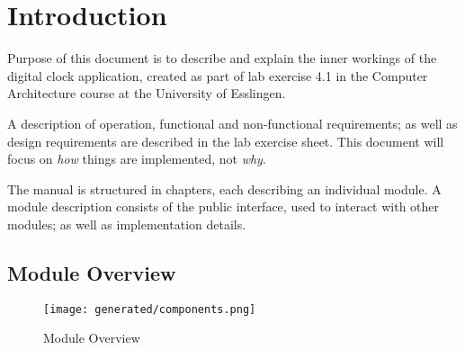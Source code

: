 \chapter{Introduction}

Purpose of this document is to describe and explain the inner workings of the digital clock application, created as part of lab exercise 4.1 in the Computer Architecture course at the University of Esslingen.

A description of operation, functional and non-functional requirements; as well as design requirements are described in the lab exercise sheet. This document will focus on \emph{how} things are implemented, not \emph{why}.

The manual is structured in chapters, each describing an individual module. A module description consists of the public interface, used to interact with other modules; as well as implementation details.

\section{Module Overview}\label{sec:module_overview}

\begin{figure}
    \centering
    \texttt{[image: generated/components.png]}
    \caption{Module Overview}
\end{figure}

